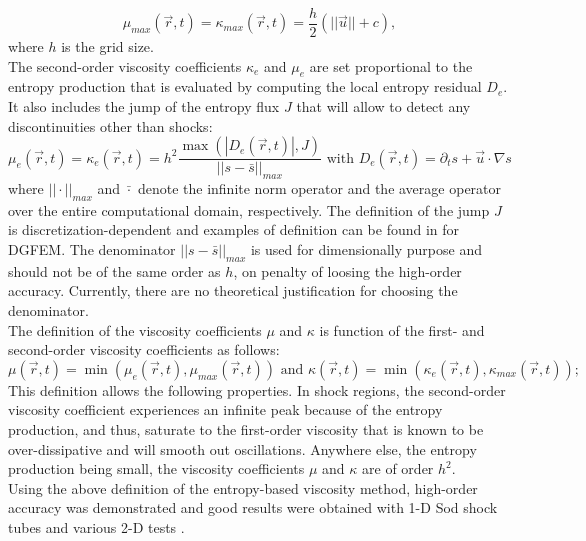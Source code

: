 \documentclass{article}
\begin{document}
\begin{equation}
\label{eq:equation15}
\mu_{max}(\vec{r}, t) = \kappa_{max}(\vec{r}, t) = \frac{h}{2} \left( || \vec{u} || + c \right),
\end{equation}
where $h$ is the grid size. \\
The second-order viscosity coefficients $\kappa_e$ and $\mu_e$ are set proportional to the entropy production that is evaluated by computing the local entropy residual $D_e$. It also includes the jump of the entropy flux $J$ that will allow to detect any discontinuities other than shocks:
\begin{equation}
\label{eq:ent_visc_coeff}
\mu_e(\vec{r},t) = \kappa_e(\vec{r},t) = h^2 \frac{\max\left( | D_e(\vec{r},t) |, J \right)}{|| s - \bar{s} ||_{max}} \text{ with } D_e(\vec{r}, t) = \partial_t s + \vec{u} \cdot \nabla s
\end{equation}
where $|| \cdot ||_{max}$ and $\bar{\cdot}$ denote the infinite norm operator and the average operator over the entire computational domain, respectively. The definition of the jump $J$ is discretization-dependent and examples of definition can be found in \cite{valentin} for DGFEM. The denominator $|| s - \bar{s} ||_{max}$ is used for dimensionally purpose and should not be of the same order as $h$, on penalty of loosing the high-order accuracy. Currently, there are no theoretical justification for choosing the denominator. \\
The definition of the viscosity coefficients $\mu$ and $\kappa$ is function of the first- and second-order viscosity coefficients as follows:
\begin{equation}
\label{eq:mu}
\mu(\vec{r},t) = \min\left( \mu_e(\vec{r},t), \mu_{max}(\vec{r},t) \right) \text{ and } \kappa(\vec{r},t) = \min\left( \kappa_e(\vec{r},t), \kappa_{max}(\vec{r},t) \right);
\end{equation}
This definition allows the following properties.
In shock regions, the second-order viscosity coefficient experiences an infinite peak because of the entropy production, and thus, saturate to the first-order viscosity that is known to be over-dissipative and will smooth out oscillations. Anywhere else, the entropy production being small, the viscosity coefficients $\mu$ and $\kappa$ are of order $h^2$.\\
Using the above definition of the entropy-based viscosity method, high-order accuracy was demonstrated and good results were obtained with 1-D Sod shock tubes and various 2-D tests \cite{valentin, jlg1, jlg2}.\\
\end{document}
